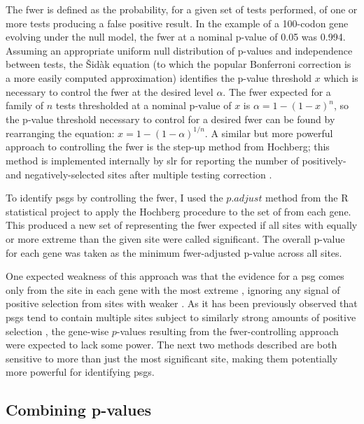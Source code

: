 The \ac{fwer} is defined as the probability, for a given set of tests
performed, of one or more tests producing a false positive result. In
the example of a 100-codon gene evolving under the null model, the
\ac{fwer} at a nominal p-value of 0.05 was 0.994. Assuming an
appropriate uniform null distribution of p-values and independence
between tests, the \v{S}id\`{a}k equation (to which the popular
Bonferroni correction is a more easily computed approximation)
identifies the p-value threshold $x$ which is necessary to control the
\ac{fwer} at the desired level $\alpha$. The \ac{fwer} expected for a
family of $n$ tests thresholded at a nominal p-value of $x$ is
$\alpha=1 - (1 - x)^{n}$, so the p-value threshold necessary to
control for a desired \ac{fwer} can be found by rearranging the
equation: $x=1 - (1 - \alpha)^{1/n}$. A similar but more powerful
approach to controlling the \ac{fwer} is the step-up method from
Hochberg; this method is implemented internally by \ac{slr} for
reporting the number of positively- and negatively-selected sites
after multiple testing correction \citep{Hochberg1988,Massingham2005}.

To identify \acp{psg} by controlling the \ac{fwer}, I used the
$p.adjust$ method from the R statistical project to apply the Hochberg
procedure to the set of \sw \pvs from each gene. This produced a
new set of \pvs representing the \ac{fwer} expected if all sites
with \pvs equally or more extreme than the given site were called
significant. The overall p-value for each gene was taken as the
minimum \ac{fwer}-adjusted p-value across all sites.

One expected weakness of this approach was that the evidence for a
\ac{psg} comes only from the site in each gene with the most extreme
\slrt, ignoring any signal of positive selection from sites with
weaker \pvs. As it has been previously observed that \acp{psg}
tend to contain multiple sites subject to similarly strong amounts of
positive selection \citep{Sawyer2005a,Kosiol2008}, the gene-wise
$p$-values resulting from the \ac{fwer}-controlling approach were
expected to lack some power. The next two methods described are both
sensitive to more than just the most significant site, making them
potentially more powerful for identifying \acp{psg}.

\subsection{Combining p-values}

